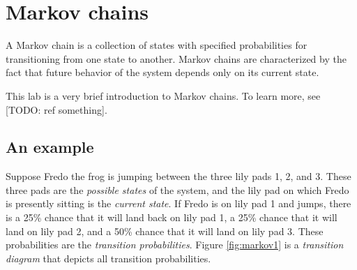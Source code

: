 \label{lab:EigSolve}

\section*{Markov chains}
A Markov chain is a collection of states with specified probabilities for transitioning from one state to another.
Markov chains are characterized by the fact that future behavior of the system depends only on its current state.

This lab is a very brief introduction to Markov chains. To learn more, see [TODO: ref something].

\subsection*{An example}
Suppose Fredo the frog is jumping between the three lily pads 1, 2, and 3.
These three pads are the \emph{possible states} of the system, and the lily pad on which Fredo is presently sitting is the \emph{current state}.
If Fredo is on lily pad 1 and jumps, there is a 25\% chance that it will land back on lily pad 1, a 25\% chance that it will land on lily pad 2, and a 50\% chance that it will land on lily pad 3.
These probabilities are the \emph{transition probabilities}.
Figure \ref{fig:markov1} is a \emph{transition diagram} that depicts all transition probabilities.

